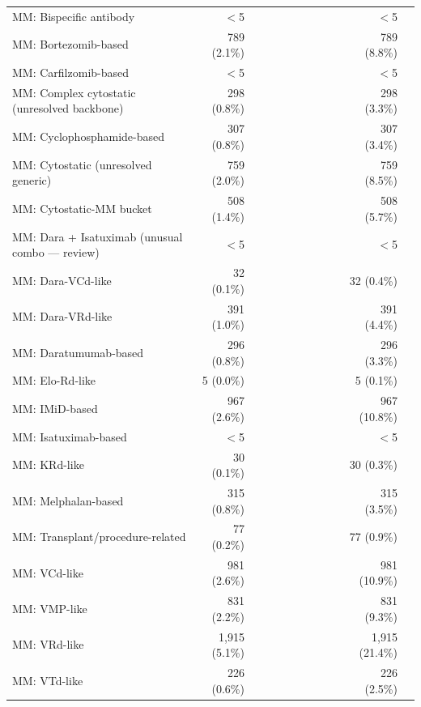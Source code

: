 \begin{table}
{\begin{tabular}{@{}lrrrrrrrrrrr@{}}
\quad MM: Bispecific antibody & $<$5 &  &  &  &  &  &  &  &  & $<$5 &  \\
\quad MM: Bortezomib-based & 789 (2.1\%) &  &  &  &  &  &  &  &  & 789 (8.8\%) &  \\
\quad MM: Carfilzomib-based & $<$5 &  &  &  &  &  &  &  &  & $<$5 &  \\
\quad MM: Complex cytostatic (unresolved backbone) & 298 (0.8\%) &  &  &  &  &  &  &  &  & 298 (3.3\%) &  \\
\quad MM: Cyclophosphamide-based & 307 (0.8\%) &  &  &  &  &  &  &  &  & 307 (3.4\%) &  \\
\quad MM: Cytostatic (unresolved generic) & 759 (2.0\%) &  &  &  &  &  &  &  &  & 759 (8.5\%) &  \\
\quad MM: Cytostatic-MM bucket & 508 (1.4\%) &  &  &  &  &  &  &  &  & 508 (5.7\%) &  \\
\quad MM: Dara + Isatuximab (unusual combo — review) & $<$5 &  &  &  &  &  &  &  &  & $<$5 &  \\
\quad MM: Dara-VCd-like & 32 (0.1\%) &  &  &  &  &  &  &  &  & 32 (0.4\%) &  \\
\quad MM: Dara-VRd-like & 391 (1.0\%) &  &  &  &  &  &  &  &  & 391 (4.4\%) &  \\
\quad MM: Daratumumab-based & 296 (0.8\%) &  &  &  &  &  &  &  &  & 296 (3.3\%) &  \\
\quad MM: Elo-Rd-like & 5 (0.0\%) &  &  &  &  &  &  &  &  & 5 (0.1\%) &  \\
\quad MM: IMiD-based & 967 (2.6\%) &  &  &  &  &  &  &  &  & 967 (10.8\%) &  \\
\quad MM: Isatuximab-based & $<$5 &  &  &  &  &  &  &  &  & $<$5 &  \\
\quad MM: KRd-like & 30 (0.1\%) &  &  &  &  &  &  &  &  & 30 (0.3\%) &  \\
\quad MM: Melphalan-based & 315 (0.8\%) &  &  &  &  &  &  &  &  & 315 (3.5\%) &  \\
\quad MM: Transplant/procedure-related & 77 (0.2\%) &  &  &  &  &  &  &  &  & 77 (0.9\%) &  \\
\quad MM: VCd-like & 981 (2.6\%) &  &  &  &  &  &  &  &  & 981 (10.9\%) &  \\
\quad MM: VMP-like & 831 (2.2\%) &  &  &  &  &  &  &  &  & 831 (9.3\%) &  \\
\quad MM: VRd-like & 1,915 (5.1\%) &  &  &  &  &  &  &  &  & 1,915 (21.4\%) &  \\
\quad MM: VTd-like & 226 (0.6\%) &  &  &  &  &  &  &  &  & 226 (2.5\%) &  \\

\end{tabular}}
\end{table}
